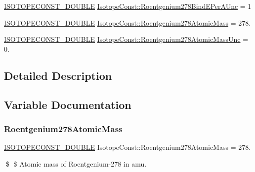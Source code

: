 \begin{DoxyCompactItemize}
\item 
\mbox{\hyperlink{group___isotope_const-_macros_ga8f45a7272ce02c0b4c65c44636ed719a}{I\+S\+O\+T\+O\+P\+E\+C\+O\+N\+S\+T\+\_\+\+D\+O\+U\+B\+LE}} \mbox{\hyperlink{group___isotope_const-_roentgenium-_rg278_ga876895ed6432f9e898c066abfc0337ac}{Isotope\+Const\+::\+Roentgenium278\+Bind\+E\+Per\+A\+Unc}} = 1
\item 
\mbox{\hyperlink{group___isotope_const-_macros_ga8f45a7272ce02c0b4c65c44636ed719a}{I\+S\+O\+T\+O\+P\+E\+C\+O\+N\+S\+T\+\_\+\+D\+O\+U\+B\+LE}} \mbox{\hyperlink{group___isotope_const-_roentgenium-_rg278_ga1d3ae7ee7707829fbe0f65b6e8988418}{Isotope\+Const\+::\+Roentgenium278\+Atomic\+Mass}} = 278.
\item 
\mbox{\hyperlink{group___isotope_const-_macros_ga8f45a7272ce02c0b4c65c44636ed719a}{I\+S\+O\+T\+O\+P\+E\+C\+O\+N\+S\+T\+\_\+\+D\+O\+U\+B\+LE}} \mbox{\hyperlink{group___isotope_const-_roentgenium-_rg278_gaf661896e346cab4514ab546570de875c}{Isotope\+Const\+::\+Roentgenium278\+Atomic\+Mass\+Unc}} = 0.
\end{DoxyCompactItemize}


\subsection{Detailed Description}


\subsection{Variable Documentation}
\mbox{\label{group___isotope_const-_roentgenium-_rg278_ga1d3ae7ee7707829fbe0f65b6e8988418}} 
\subsubsection{\texorpdfstring{Roentgenium278\+Atomic\+Mass}{Roentgenium278AtomicMass}}
{\footnotesize\ttfamily \mbox{\hyperlink{group___isotope_const-_macros_ga8f45a7272ce02c0b4c65c44636ed719a}{I\+S\+O\+T\+O\+P\+E\+C\+O\+N\+S\+T\+\_\+\+D\+O\+U\+B\+LE}} Isotope\+Const\+::\+Roentgenium278\+Atomic\+Mass = 278.}

\$ \$ Atomic mass of Roentgenium-\/278 in amu. \mbox{\label{group___isotope_const-_roentgenium-_rg278_gaf661896e346cab4514ab546570de875c}} 
